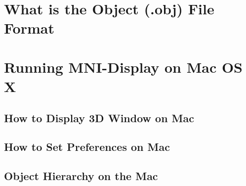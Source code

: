 \documentclass[11pt,letterpaper]{article}
\newcommand{\display}{\mbox{MNI-Display}}
\begin{document}
\section{What is the Object (.obj) File Format}

\section{Running \display{} on Mac OS X}

\subsection{How to Display 3D Window on Mac}

\subsection{How to Set Preferences on Mac}

\subsection{Object Hierarchy on the Mac}


\end{document}
